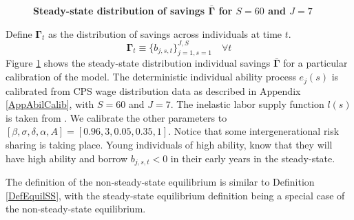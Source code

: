 \documentclass[letterpaper,12pt]{article}
\theoremstyle{definition}
\begin{document}
\begin{spacing}{1.5}
    \begin{figure}[htb]\centering \captionsetup{width=4.0in}
      \caption{\label{FigSavSS}\textbf{Steady-state distribution of savings $\bar{\bm{\Gamma}}$ for $S=60$ and $J=7$}}
    \end{figure}

    Define $\bm{\Gamma}_t$ as the distribution of savings across individuals at time $t$.
    \begin{equation}\label{EqSavDist}
      \bm{\Gamma}_t \equiv \{b_{j,s,t}\}_{j=1,s=1}^{J,S} \quad\forall t
    \end{equation}
    Figure \ref{FigSavSS} shows the steady-state distribution individual savings $\bar{\bm{\Gamma}}$ for a particular calibration of the model. The deterministic individual ability process $e_j(s)$ is calibrated from CPS wage distribution data as described in Appendix \ref{AppAbilCalib}, with $S=60$ and $J=7$. The inelastic labor supply function $l(s)$ is taken from \citet{EvansPhillips:2014}. We calibrate the other parameters to $[\beta,\sigma,\delta,\alpha,A] = [0.96,3,0.05,0.35,1]$. Notice that some intergenerational risk sharing is taking place. Young individuals of high ability, know that they will have high ability and borrow $b_{j,s,t}<0$ in their early years in the steady-state.

    The definition of the non-steady-state equilibrium is similar to Definition \ref{DefEquilSS}, with the steady-state equilibrium definition being a special case of the non-steady-state equilibrium.

    \vspace{7mm}
    \end{spacing}
\end{document}
